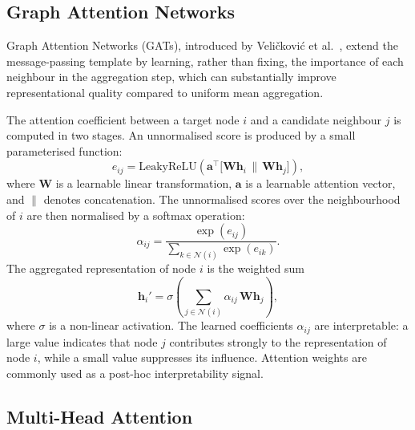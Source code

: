 \documentclass[%
    BCOR=10mm,
    DIV=13,
    toc=bibliography,
    toc=listof,
    oneside,
    12pt,
]{scrbook}
\begin{document}
\subsection{Graph Attention Networks}
\label{subsec:gat}

Graph Attention Networks (GATs), introduced by Veli\v{c}kovi\'{c} et
al.~\cite{velickovic2018gat}, extend the message-passing template by
learning, rather than fixing, the importance of each neighbour in the
aggregation step, which can substantially improve representational quality
compared to uniform mean aggregation.

The attention coefficient between a target node $i$ and a candidate neighbour
$j$ is computed in two stages. An unnormalised score is produced by a small
parameterised function: \begin{equation} e_{ij} = \mathrm{LeakyReLU}\!\left(
\mathbf{a}^\top \bigl[ \mathbf{W} \mathbf{h}_i \,\|\, \mathbf{W} \mathbf{h}_j
\bigr] \right), \label{eq:gat_score} \end{equation} where $\mathbf{W}$ is a
learnable linear transformation, $\mathbf{a}$ is a learnable attention vector,
and $\|$ denotes concatenation. The unnormalised scores over the neighbourhood
of $i$ are then normalised by a softmax operation: \begin{equation}
\alpha_{ij} = \frac{\exp(e_{ij})}{\sum_{k \in \mathcal{N}(i)} \exp(e_{ik})}.
\label{eq:gat_alpha} \end{equation} The aggregated representation of node $i$
is the weighted sum \begin{equation} \mathbf{h}_i' = \sigma\!\left( \sum_{j
\in \mathcal{N}(i)} \alpha_{ij}\, \mathbf{W} \mathbf{h}_j \right),
\label{eq:gat_agg} \end{equation} where $\sigma$ is a non-linear activation.
The learned coefficients $\alpha_{ij}$ are interpretable: a large value
indicates that node $j$ contributes strongly to the representation of node
$i$, while a small value suppresses its influence. Attention weights are
commonly used as a post-hoc interpretability signal.

\subsection{Multi-Head Attention}
\label{subsec:multihead}
\end{document}
